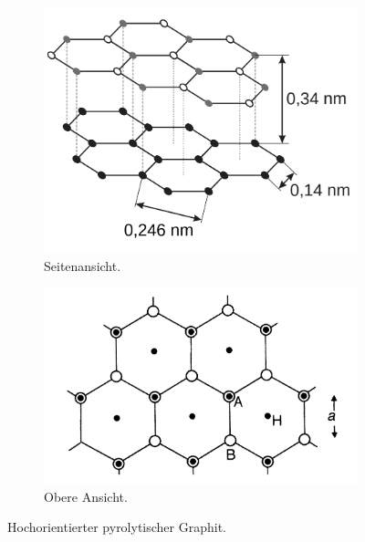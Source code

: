 \begin{figure}[htb]
	\centering
	\begin{subfigure}{0.45\linewidth}
		\includegraphics[width=\linewidth]{figs/hopg1.png}
		\caption{Seitenansicht.\cite{skript}}
		\label{fig:hopg1}
	\end{subfigure}
	\hspace{0.5cm}
	\begin{subfigure}{0.45\linewidth}
		\includegraphics[width=\linewidth]{figs/hopg2.png}
		\caption{Obere Ansicht.\cite{rtm-leitpfaden}}
		\label{fig:hopg2}
	\end{subfigure}
	\caption{Hochorientierter pyrolytischer Graphit.}
	\label{fig:hopg-skizze}
\end{figure}
